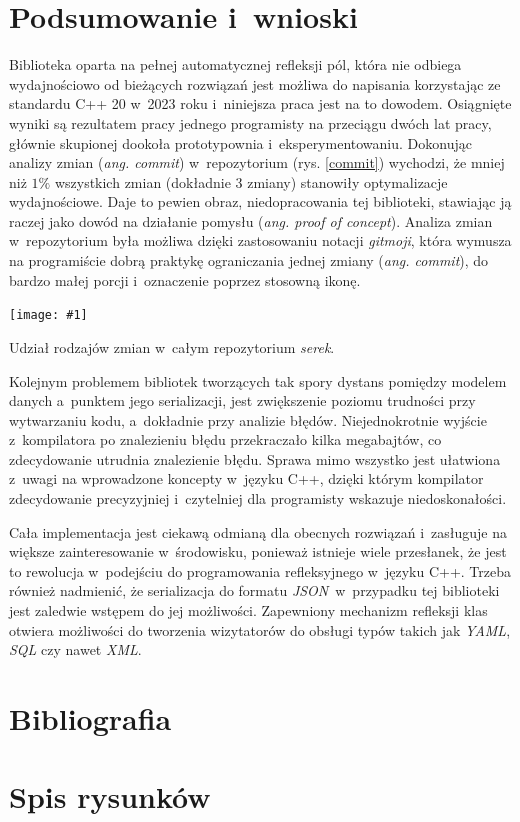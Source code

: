 \documentclass[12pt]{article}
\newcommand{\n}{\newline}
\newcommand{\putfig}[3]{
\begin{captioned}[H]
	\centering
	\texttt{[image: \#1]}
	\caption{#2}
	\label{#3}
	\medskip
\end{captioned}
}
\newcommand{\nonpl}[1]{{\it #1}}
\newcommand{\ang}[1]{\nonpl{ang. #1}}
\newcommand{\JSON}{\nonpl{JSON}}
\newcommand{\serek}{\nonpl{serek}}
\begin{document}
{		{
			\section{Podsumowanie i~wnioski}

			Biblioteka oparta na pełnej automatycznej refleksji pól, która nie odbiega wydajnościowo od bieżących rozwiązań jest możliwa do napisania korzystając
			ze standardu C++ 20 w~2023 roku i~niniejsza praca jest na to dowodem. Osiągnięte wyniki są rezultatem pracy jednego programisty na przeciągu dwóch lat
			pracy, głównie skupionej dookoła prototypownia i~eksperymentowaniu. Dokonując analizy zmian (\ang{commit}) w~repozytorium (rys. \ref{commit}) wychodzi,
			że mniej niż $1\%$ wszystkich zmian (dokładnie $3$ zmiany) stanowiły optymalizacje wydajnościowe. Daje to pewien obraz, niedopracowania tej biblioteki,
			stawiając ją raczej jako dowód na działanie pomysłu (\ang{proof of concept}). Analiza zmian w~repozytorium była możliwa dzięki zastosowaniu notacji
			\nonpl{gitmoji}\cite{gitmoji}, która wymusza na programiście dobrą praktykę ograniczania jednej zmiany (\ang{commit}), do bardzo małej porcji
			i~oznaczenie poprzez stosowną ikonę.

			\putfig{./charts/pre_generated_charts/commit_percentage.png}{Udział rodzajów zmian w~całym repozytorium \serek.}{commit}

			\newpage

			Kolejnym problemem bibliotek tworzących tak spory dystans pomiędzy modelem danych a~punktem jego serializacji, jest zwiększenie poziomu trudności
			przy wytwarzaniu kodu, a~dokładnie przy analizie błędów. Niejednokrotnie wyjście z~kompilatora po znalezieniu błędu przekraczało kilka megabajtów,
			co zdecydowanie utrudnia znalezienie błędu. Sprawa mimo wszystko jest ułatwiona z~uwagi na wprowadzone koncepty w~języku C++, dzięki którym kompilator
			zdecydowanie precyzyjniej i~czytelniej dla programisty wskazuje niedoskonałości.\n

			Cała implementacja jest ciekawą odmianą dla obecnych rozwiązań i~zasługuje na większe zainteresowanie w~środowisku, ponieważ istnieje wiele przesłanek, że
			jest to rewolucja w~podejściu do programowania refleksyjnego w~języku C++. Trzeba również nadmienić, że serializacja do formatu \JSON~w~przypadku tej biblioteki
			jest zaledwie wstępem do jej możliwości. Zapewniony mechanizm refleksji klas otwiera możliwości do tworzenia wizytatorów do obsługi typów takich jak \nonpl{YAML}, \nonpl{SQL}
			czy nawet \nonpl{XML}.
		}
	}

	{
		\section{Bibliografia}
		\printbibliography[heading=none]
	}

	{

		\section{Spis rysunków}
		\listofcaptioneds
		\thispagestyle{fancy}
	}
\end{document}
